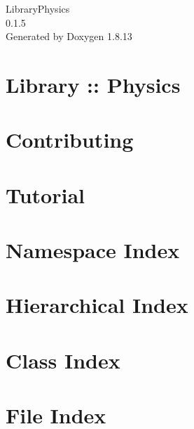 \documentclass[twoside]{book}
\newcommand{\+}{\discretionary{\mbox{\scriptsize$\hookleftarrow$}}{}{}}
\newcommand{\clearemptydoublepage}{%
  \newpage{\pagestyle{empty}\cleardoublepage}%
}
\begin{document}
\hypersetup{pageanchor=false,
             bookmarksnumbered=true,
             pdfencoding=unicode
            }
\begin{titlepage}
\vspace*{7cm}
\begin{center}%
{\Large Library\+Physics \\[1ex]\large 0.\+1.\+5 }\\
\vspace*{1cm}
{\large Generated by Doxygen 1.8.13}\\
\end{center}
\end{titlepage}
\clearemptydoublepage
{}
\tableofcontents
\clearemptydoublepage
{}
\hypersetup{pageanchor=true}

\chapter{Library \+:\+: Physics}
\label{index}\hypertarget{index}{}
\chapter{Contributing}
\label{md__c_o_n_t_r_i_b_u_t_i_n_g}

\chapter{Tutorial}
\label{md_docs__tutorial}

\chapter{Namespace Index}

\chapter{Hierarchical Index}

\chapter{Class Index}

\chapter{File Index}

\end{document}
